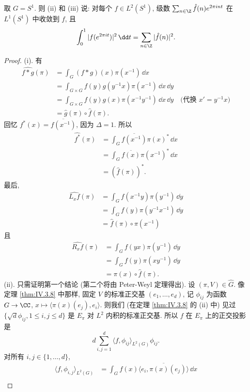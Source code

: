 \begin{example}[$S^1$ 的 Fourier 级数]
\label{exa:IV.6.4}
取 $G = S^1$. 则 (ii) 和 (iii) 说: 对每个 $f \in L^2(S^1)$, 级数 $\sum_{n \in \Z}\hat{f}(n)e^{2\pi int}$ 在 $L^1(S^1)$ 中收敛到 $f$, 且
\[
\int_0^1|f(e^{2\pi it})|^2\,\dd t = \sum_{n \in \Z}|\hat{f}(n)|^2.
\]
\end{example}

\begin{proof}
(i). 有
\begin{align*}
\widehat{f * g}(\pi) &= \int_G (f * g)(x)\pi(x^{-1})\,\dd x \\
&= \int_{G \times G}f(y)g(y^{-1}x)\pi(x^{-1})\,\dd x\,\dd y \\
&= \int_{G \times G}f(y)g(x)\pi(x^{-1}y^{-1})\,\dd x\,\dd y \quad \text{(代换 } x' = y^{-1}x\text{)} \\
&= \hat{g}(\pi) \circ \hat{f}(\pi).
\end{align*}
回忆 $f^*(x) = \overline{f(x^{-1})}$, 因为 $\Delta = 1$. 所以
\begin{align*}
\widehat{f^*}(\pi) &= \int_G \overline{f(x^{-1})}\pi(x)^*\,\dd x \\
&= \int_G \overline{f(x)}\pi(x^{-1})^*\,\dd x \\
&= (\hat{f}(\pi))^*.
\end{align*}
最后,
\begin{align*}
\widehat{L_xf}(\pi) &= \int_G f(x^{-1}y)\pi(y^{-1})\,\dd y \\
&= \int_G f(y)\pi(y^{-1}x^{-1})\,\dd y \\
&= \hat{f}(\pi) \circ \pi(x^{-1})
\end{align*}
且
\begin{align*}
\widehat{R_xf}(\pi) &= \int_G f(yx)\pi(y^{-1})\,\dd y \\
&= \int_G f(y)\pi(xy^{-1})\,\dd y \\
&= \pi(x) \circ \hat{f}(\pi).
\end{align*}
(ii). 只需证明第一个结论 (第二个将由 Peter-Weyl 定理得出). 设 $(\pi, V) \in \widehat{G}$. 像定理 \ref{thm:IV.3.8} 中那样, 固定 $V$ 的标准正交基 $(e_1, \ldots, e_d)$, 记 $\phi_{ij}$ 为函数 $G \to \CC$, $x \longmapsto \langle \pi(x)(e_j), e_i \rangle$. 则我们 (在定理 \ref{thm:IV.3.8} 的 (ii) 中) 见过 $\{\sqrt{d}\phi_{ij}, 1 \leq i, j \leq d\}$ 是 $E_{\pi}$ 对 $L^2$ 内积的标准正交基. 所以 $f$ 在 $E_{\pi}$ 上的正交投影是
\[
d\sum_{i,j=1}^d\langle f, \phi_{ij} \rangle_{L^2(G)}\phi_{ij}.
\]
对所有 $i, j \in \{1, \ldots, d\}$,
\begin{align*}
\langle f, \phi_{i,j} \rangle_{L^2(G)} &= \int_G f(x)\overline{\langle e_i, \pi(x)(e_j) \rangle}\,\dd x \\

\end{align*}
\end{proof}
